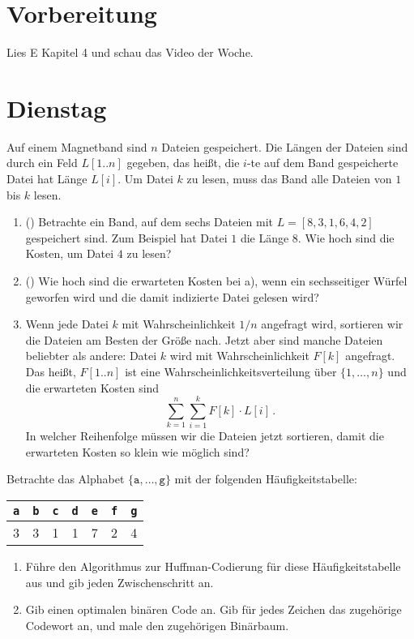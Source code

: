 \documentclass{uebung_cs}
\begin{document}
\section*{Vorbereitung}
Lies E Kapitel 4 und schau das Video der Woche.

\section*{Dienstag}
\begin{aufgabe}
    Auf einem Magnetband sind $n$ Dateien gespeichert.
    Die Längen der Dateien sind durch ein Feld $L[1..n]$ gegeben, das heißt, die $i$-te auf dem Band gespeicherte Datei hat Länge $L[i]$.
    Um Datei $k$ zu lesen, muss das Band alle Dateien von $1$ bis $k$ lesen.
    \begin{enumerate}
        \item(\warmup) Betrachte ein Band, auf dem sechs Dateien mit $L=[8,3,1,6,4,2]$ gespeichert sind. Zum Beispiel hat Datei $1$ die Länge $8$.
        Wie hoch sind die Kosten, um Datei $4$ zu lesen?
        \item(\warmup) Wie hoch sind die erwarteten Kosten bei a), wenn ein sechsseitiger Würfel geworfen wird und die damit indizierte Datei gelesen wird?
        \item Wenn jede Datei $k$ mit Wahrscheinlichkeit $1/n$ angefragt wird, sortieren wir die Dateien am Besten der Größe nach. Jetzt aber sind manche Dateien beliebter als andere: Datei $k$ wird mit Wahrscheinlichkeit $F[k]$ angefragt. Das heißt, $F[1..n]$ ist eine Wahrscheinlichkeitsverteilung über $\{1,\dots,n\}$ und die erwarteten Kosten sind
          \[\sum_{k=1}^n \sum_{i=1}^k F[k]\cdot L[i]\,.\]
        In welcher Reihenfolge müssen wir die Dateien jetzt sortieren, damit die erwarteten Kosten so klein wie möglich sind?
    \end{enumerate}
\end{aufgabe}

\begin{aufgabe}
    Betrachte das Alphabet $\{\texttt a,\dots,\texttt g\}$ mit der folgenden Häufigkeitstabelle:
	\begin{center}
		\begin{tabular}{ccccccc}
			\texttt{a}&\texttt{b}&\texttt{c}&\texttt{d}&\texttt{e}&\texttt{f}&\texttt{g}\\\hline
			3&3&1&1&7&2&4\\
		\end{tabular}
	\end{center}
    \begin{enumerate}
        \item Führe den Algorithmus zur Huffman-Codierung für diese Häufigkeitstabelle aus und gib jeden Zwischenschritt an.
        \item Gib einen optimalen binären Code an. Gib für jedes Zeichen das zugehörige Codewort an, und male den zugehörigen Binärbaum.
    \end{enumerate}
\end{aufgabe}
\end{document}
